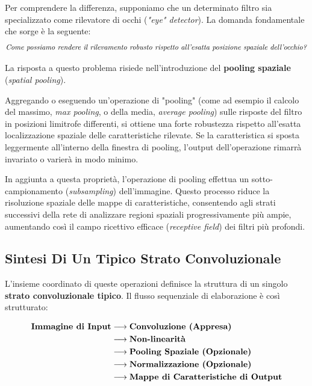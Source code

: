 ﻿\documentclass[11pt, a4paper]{article}
\begin{document}
Per comprendere la differenza, supponiamo che un determinato filtro sia specializzato come rilevatore di occhi (\emph{"eye" detector}). La domanda fondamentale che sorge è la seguente:
\[
\text{\emph{Come possiamo rendere il rilevamento robusto rispetto all'esatta posizione spaziale dell'occhio?}}
\]


La risposta a questo problema risiede nell'introduzione del \textbf{pooling spaziale} (\emph{spatial pooling}).

Aggregando o eseguendo un'operazione di "pooling" (come ad esempio il calcolo del massimo, \emph{max pooling}, o della media, \emph{average pooling}) sulle risposte del filtro in posizioni limitrofe differenti, si ottiene una forte robustezza rispetto all'esatta localizzazione spaziale delle caratteristiche rilevate. Se la caratteristica si sposta leggermente all'interno della finestra di pooling, l'output dell'operazione rimarrà invariato o varierà in modo minimo.

In aggiunta a questa proprietà, l'operazione di pooling effettua un sotto-campionamento (\emph{subsampling}) dell'immagine. Questo processo riduce la risoluzione spaziale delle mappe di caratteristiche, consentendo agli strati successivi della rete di analizzare regioni spaziali progressivamente più ampie, aumentando così il campo ricettivo efficace (\emph{receptive field}) dei filtri più profondi.


\newpage

\subsection{Sintesi Di Un Tipico Strato Convoluzionale}

L'insieme coordinato di queste operazioni definisce la struttura di un singolo \textbf{strato convoluzionale tipico}. Il flusso sequenziale di elaborazione è così strutturato:

\begin{align*}
\text{\textbf{Immagine di Input}} &\longrightarrow \text{\textbf{Convoluzione (Appresa)}} \\
&\longrightarrow \text{\textbf{Non-linearità}} \\
&\longrightarrow \text{\textbf{Pooling Spaziale (Opzionale)}} \\
&\longrightarrow \text{\textbf{Normalizzazione (Opzionale)}} \\
&\longrightarrow \text{\textbf{Mappe di Caratteristiche di Output}}
\end{align*}
\end{document}
